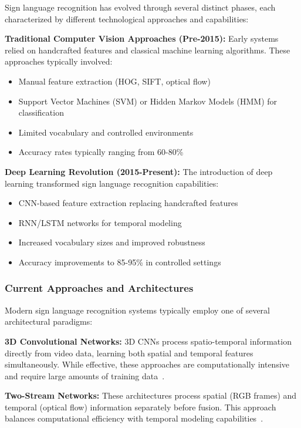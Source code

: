 \documentclass[11pt, a4paper]{article}
\begin{document}
Sign language recognition has evolved through several distinct phases, each characterized by different technological approaches and capabilities:

\textbf{Traditional Computer Vision Approaches (Pre-2015):}
Early systems relied on handcrafted features and classical machine learning algorithms. These approaches typically involved:
\begin{itemize}
    \item Manual feature extraction (HOG, SIFT, optical flow)
    \item Support Vector Machines (SVM) or Hidden Markov Models (HMM) for classification
    \item Limited vocabulary and controlled environments
    \item Accuracy rates typically ranging from 60-80\%~\cite{Ong05}
\end{itemize}

\textbf{Deep Learning Revolution (2015-Present):}
The introduction of deep learning transformed sign language recognition capabilities:
\begin{itemize}
    \item CNN-based feature extraction replacing handcrafted features
    \item RNN/LSTM networks for temporal modeling
    \item Increased vocabulary sizes and improved robustness
    \item Accuracy improvements to 85-95\% in controlled settings~\cite{Huang18}
\end{itemize}

\subsubsection{Current Approaches and Architectures}

Modern sign language recognition systems typically employ one of several architectural paradigms:

\textbf{3D Convolutional Networks:}
3D CNNs process spatio-temporal information directly from video data, learning both spatial and temporal features simultaneously. While effective, these approaches are computationally intensive and require large amounts of training data~\cite{Tran15}.

\textbf{Two-Stream Networks:}
These architectures process spatial (RGB frames) and temporal (optical flow) information separately before fusion. This approach balances computational efficiency with temporal modeling capabilities~\cite{Simonyan14}.
\end{document}
